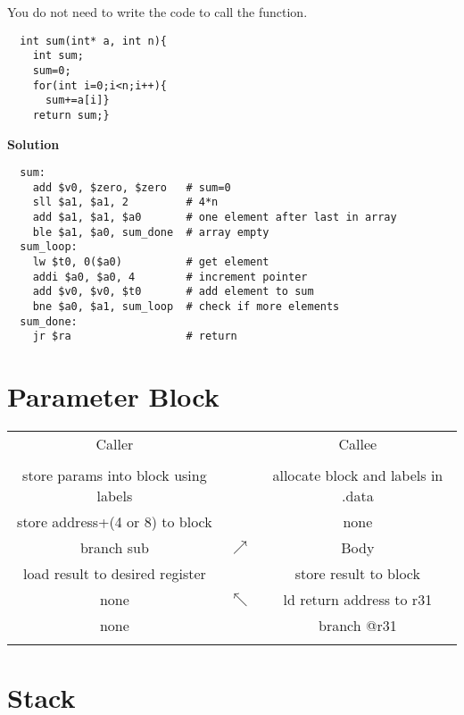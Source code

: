 You do not need to write the code to call the function.

\begin{verbatim}
  int sum(int* a, int n){
    int sum;
    sum=0;
    for(int i=0;i<n;i++){
      sum+=a[i]}
    return sum;}
\end{verbatim}



\vspace{6pt}
\textbf{Solution}
\vspace{6pt}

\begin{verbatim}
  sum:
    add $v0, $zero, $zero   # sum=0
    sll $a1, $a1, 2         # 4*n
    add $a1, $a1, $a0       # one element after last in array
    ble $a1, $a0, sum_done  # array empty
  sum_loop:
    lw $t0, 0($a0)          # get element
    addi $a0, $a0, 4        # increment pointer
    add $v0, $v0, $t0       # add element to sum
    bne $a0, $a1, sum_loop  # check if more elements
  sum_done:
    jr $ra                  # return
\end{verbatim}



\section{Parameter Block}

\begin{tabular}{|c|c|c|}
  \multicolumn{1}{c}{Caller} & \multicolumn{1}{c}{ } & \multicolumn{1}{c}{Callee} \\
  &  &  \\ \cline{1-1} \cline{3-3}
  store params into block using labels & & allocate block and labels in .data \\
  store address+(4 or 8) to block  &  & none \\ \cline{3-3}
  branch sub     & $\nearrow$  & Body \\ \cline{1-1} \cline{3-3}
  load result to desired register &   & store result to block \\
  none           & $\nwarrow$ & ld return address to r31 \\
  none           &  & branch @r31 \\ \cline{1-1} \cline{3-3}
  & & \\
\end{tabular}

\section{Stack}

